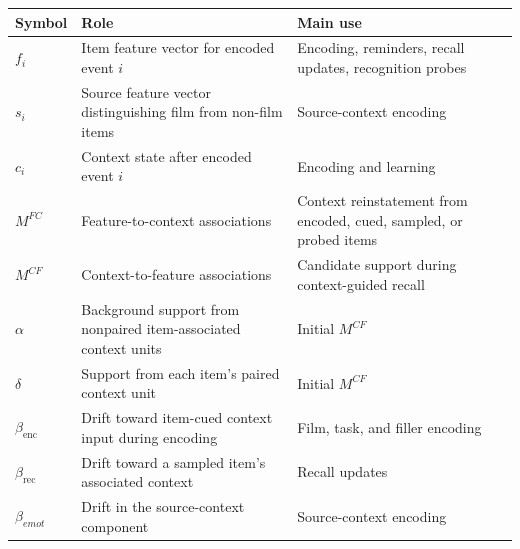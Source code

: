 \documentclass[
  man,
  floatsintext,
  longtable,
  nolmodern,
  notxfonts,
  notimes,
  draftfirst,
  colorlinks=true,linkcolor=blue,citecolor=blue,urlcolor=blue]{apa7}
\begin{document}
\begin{table}

{\caption{{Core notation used in the model specification. Parameters are
defined with the operations they control, and numerical values are
reported with the simulation methodology.}{\label{tbl-model-notation}}}
\vspace{-20pt}}

\begin{longtable}[]{@{}
  >{\raggedright\arraybackslash}p{}
  >{\raggedright\arraybackslash}p{}
  >{\raggedright\arraybackslash}p{}@{}}
\toprule\noalign{}
\begin{minipage}[b]{\linewidth}\raggedright
Symbol
\end{minipage} & \begin{minipage}[b]{\linewidth}\raggedright
Role
\end{minipage} & \begin{minipage}[b]{\linewidth}\raggedright
Main use
\end{minipage} \\
\midrule\noalign{}
\endhead
\bottomrule\noalign{}
\endlastfoot
\(f_i\) & Item feature vector for encoded event \(i\) & Encoding,
reminders, recall updates, recognition probes \\
\(s_i\) & Source feature vector distinguishing film from non-film items
& Source-context encoding \\
\(c_i\) & Context state after encoded event \(i\) & Encoding and
learning \\
\(M^{FC}\) & Feature-to-context associations & Context reinstatement
from encoded, cued, sampled, or probed items \\
\(M^{CF}\) & Context-to-feature associations & Candidate support during
context-guided recall \\
\(\alpha\) & Background support from nonpaired item-associated context
units & Initial \(M^{CF}\) \\
\(\delta\) & Support from each item's paired context unit & Initial
\(M^{CF}\) \\
\(\beta_{\mathrm{enc}}\) & Drift toward item-cued context input during
encoding & Film, task, and filler encoding \\
\(\beta_{\mathrm{rec}}\) & Drift toward a sampled item's associated
context & Recall updates \\
\(\beta_{emot}\) & Drift in the source-context component &
Source-context encoding \\

\end{longtable}
\end{table}
\end{document}
